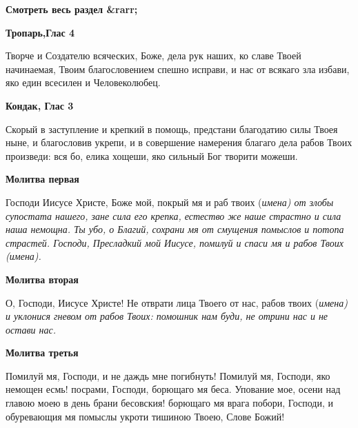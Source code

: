 




\bfseries Смотреть весь раздел &rarr;\normalfont{} 




\bfseries Тропарь,Глас 4\normalfont{}


Творче и Создателю всяческих, Боже, дела рук наших, ко славе Твоей начинаемая, Твоим благословением спешно исправи, и нас от всякаго зла избави, яко един всесилен и Человеколюбец.


\medskip


\bfseries Кондак, Глас 3\normalfont{}


Скорый в заступление и крепкий в помощь, предстани благодатию силы Твоея ныне, и благословив укрепи, и в совершение намерения благаго дела рабов Твоих произведи: вся бо, елика хощеши, яко сильный Бог творити можеши. 


\mychapterending







\bfseries Молитва первая\normalfont{}


Господи Иисусе Христе, Боже мой, покрый мя и раб твоих (\itshape имена\normalfont{}) от злобы супостата нашего, зане сила его крепка, естество же наше страстно и сила наша немощна. Ты убо, о Благий, сохрани мя от смущения помыслов и потопа страстей. Господи, Пресладкий мой Иисусе, помилуй и спаси мя и рабов Твоих (\itshape имена\normalfont{}).





\bfseries Молитва вторая\normalfont{}


О, Господи, Иисусе Христе! Не отврати лица Твоего от нас, рабов твоих (\itshape имена\normalfont{}) и уклонися гневом от рабов Твоих: помошник нам буди, не отрини нас и не остави нас.





\bfseries Молитва третья\normalfont{}


Помилуй мя, Господи, и не даждь мне погибнуть! Помилуй мя, Господи, яко немощен есмь! посрами, Господи, борющаго мя беса. Упование мое, осени над главою моею в день брани бесовския! борющаго мя врага побори, Господи, и обуревающия мя помыслы укроти тишиною Твоею, Слове Божий!





